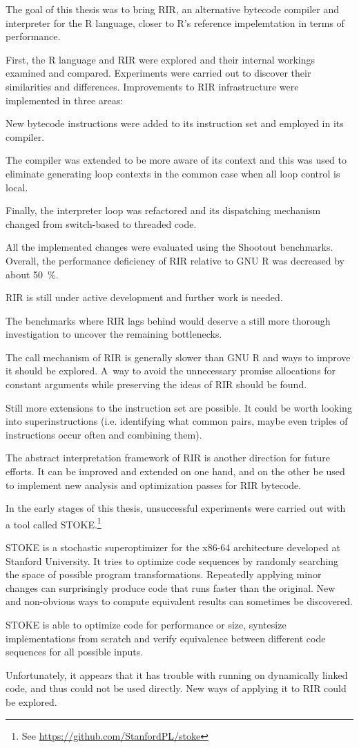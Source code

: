 The goal of this thesis was to bring RIR, an alternative bytecode compiler and interpreter for the R language, closer to R's reference impelemtation in terms of performance.

First, the R language and RIR were explored and their internal workings examined and compared. Experiments were carried out to discover their similarities and differences. Improvements to RIR infrastructure were implemented in three areas:

New bytecode instructions were added to its instruction set and employed in its compiler.

The compiler was extended to be more aware of its context and this was used to eliminate generating loop contexts in the common case when all loop control is local.

Finally, the interpreter loop was refactored and its dispatching mechanism changed from switch-based to threaded code.

All the implemented changes were evaluated using the Shootout benchmarks. Overall, the performance deficiency of RIR relative to GNU R was decreased by about 50~\%.

RIR is still under active development and further work is needed.

The benchmarks where RIR lags behind would deserve a still more thorough investigation to uncover the remaining bottlenecks.

The call mechanism of RIR is generally slower than GNU R and ways to improve it should be explored. A~way to avoid the unnecessary promise allocations for constant arguments while preserving the ideas of RIR should be found.

Still more extensions to the instruction set are possible. It could be worth looking into superinstructions (i.e. identifying what common pairs, maybe even triples of instructions occur often and combining them).

The abstract interpretation framework of RIR is another direction for future efforts. It can be improved and extended on one hand, and on the other be used to implement new analysis and optimization passes for RIR bytecode.

In the early stages of this thesis, unsuccessful experiments were carried out with a tool called STOKE.\footnote{See \url{https://github.com/StanfordPL/stoke}}

STOKE is a stochastic superoptimizer for the x86-64 architecture developed at Stanford University. It tries to optimize code sequences by randomly searching the space of possible program transformations. Repeatedly applying minor changes can surprisingly produce code that runs faster than the original. New and non-obvious ways to compute equivalent results can sometimes be discovered.

STOKE is able to optimize code for performance or size, syntesize implementations from scratch and verify equivalence between different code sequences for all possible inputs.

Unfortunately, it appears that it has trouble with running on dynamically linked code, and thus could not be used directly. New ways of applying it to RIR could be explored.
